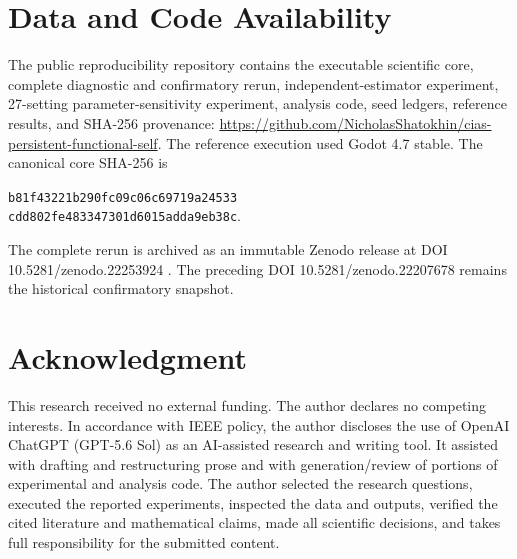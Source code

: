 \documentclass[journal]{IEEEtran}
\begin{document}
\section*{Data and Code Availability}
The public reproducibility repository contains the executable scientific core, complete diagnostic and confirmatory rerun, independent-estimator experiment, 27-setting parameter-sensitivity experiment, analysis code, seed ledgers, reference results, and SHA-256 provenance: \url{https://github.com/NicholasShatokhin/cias-persistent-functional-self}. The reference execution used Godot 4.7 stable. The canonical core SHA-256 is
\begin{center}
\small\texttt{b81f43221b290fc09c06c69719a24533}\\
\texttt{cdd802fe483347301d6015adda9eb38c}.
\end{center}
The complete rerun is archived as an immutable Zenodo release at DOI 10.5281/zenodo.22253924 \cite{CIASRepo2026}. The preceding DOI 10.5281/zenodo.22207678 remains the historical confirmatory snapshot.

\section*{Acknowledgment}
This research received no external funding. The author declares no competing interests. In accordance with IEEE policy, the author discloses the use of OpenAI ChatGPT (GPT-5.6 Sol) as an AI-assisted research and writing tool. It assisted with drafting and restructuring prose and with generation/review of portions of experimental and analysis code. The author selected the research questions, executed the reported experiments, inspected the data and outputs, verified the cited literature and mathematical claims, made all scientific decisions, and takes full responsibility for the submitted content.



\end{document}

